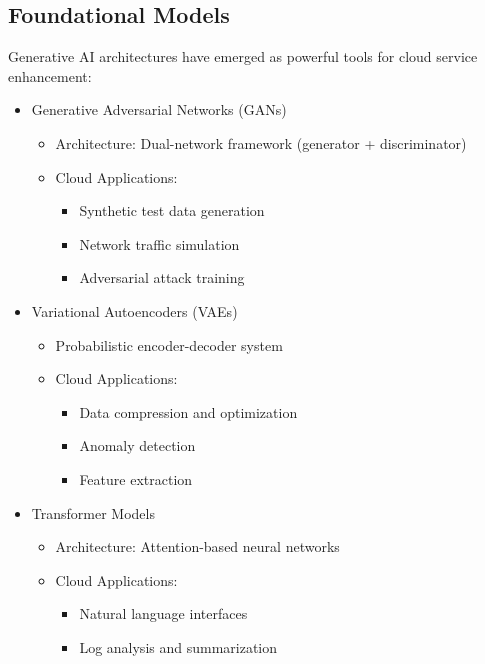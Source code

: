 \documentclass[a4paper,12pt]{article}
\begin{document}
\subsection{Foundational Models}
Generative AI architectures have emerged as powerful tools for cloud service enhancement:
\begin{itemize}
    \item Generative Adversarial Networks (GANs)
          \begin{itemize}
              \item Architecture: Dual-network framework (generator + discriminator)
              \item Cloud Applications:
                    \begin{itemize}
                        \item Synthetic test data generation
                        \item Network traffic simulation
                        \item Adversarial attack training
                    \end{itemize}
          \end{itemize}
    \item Variational Autoencoders (VAEs)
          \begin{itemize}
              \item Probabilistic encoder-decoder system
              \item Cloud Applications:
                    \begin{itemize}
                        \item Data compression and optimization
                        \item Anomaly detection
                        \item Feature extraction
                    \end{itemize}
          \end{itemize}
    \item Transformer Models
          \begin{itemize}
              \item Architecture: Attention-based neural networks
              \item Cloud Applications:
                    \begin{itemize}
                        \item Natural language interfaces
                        \item Log analysis and summarization

\end{itemize}
\end{itemize}
\end{itemize}
\end{document}
